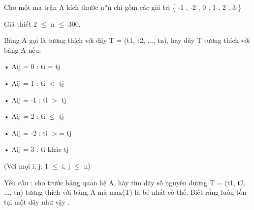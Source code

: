 Cho một ma trận A kích thước n*n chỉ gồm các giá trị \{ -1 , -2 , 0 , 1 , 2 , 3 \}   


   Giả thiết 2  $\le$  n  $\le$  300.   


   Bảng A gọi là tương thích với dãy T = (t1, t2, ..., tn), hay dãy T tương thích với bảng A nếu:   


   • Aij = 0  :   ti = tj   


   • Aij = 1  :   ti $<$ tj   


   • Aij = -1 :   ti $>$ tj   


   • Aij = 2  :  ti  $\le$  tj   


   • Aij = -2 :   ti $>$= tj   


   • Aij = 3  :   ti khác tj   


   (Với mọi i, j: 1  $\le$  i, j  $\le$  n)   


   Yêu cầu : cho trước bảng quan hệ A, hãy tìm dãy số nguyên dương T = (t1, t2, ..., tn) tương thích với bảng A mà max(T) là bé nhất có thể. Biết rằng luôn tồn tại một dãy như vậy .